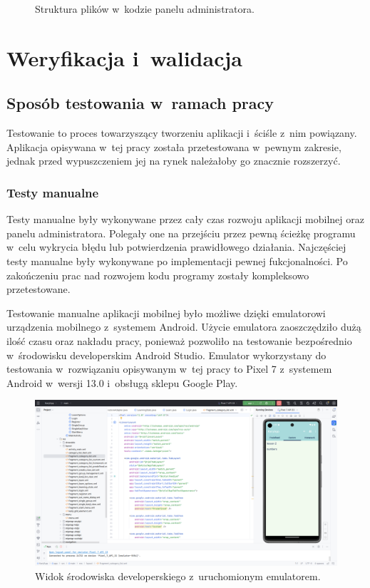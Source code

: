 \documentclass[a4paper,twoside,12pt]{book}
\begin{document}
\begin{figure}
\caption{Struktura plików w~kodzie panelu administratora.}
\label{fig:dirtree}
\end{figure}

\chapter{Weryfikacja i~walidacja}
\label{ch:06}

\section{Sposób testowania w~ramach pracy}

Testowanie to proces towarzyszący tworzeniu aplikacji i~ściśle z~nim powiązany. Aplikacja opisywana w~tej pracy została przetestowana w~pewnym zakresie, jednak przed wypuszczeniem jej na rynek należałoby go znacznie rozszerzyć.

\subsection{Testy manualne}

Testy manualne były wykonywane przez cały czas rozwoju aplikacji mobilnej oraz panelu administratora. Polegały one na przejściu przez pewną ścieżkę programu w~celu wykrycia błędu lub potwierdzenia prawidłowego działania. Najczęściej testy manualne były wykonywane po implementacji pewnej fukcjonalności. Po zakończeniu prac nad rozwojem kodu programy zostały kompleksowo przetestowane. 

Testowanie manualne aplikacji mobilnej było możliwe dzięki emulatorowi urządzenia mobilnego z~systemem Android. Użycie emulatora zaoszczędziło dużą ilość czasu oraz nakładu pracy, ponieważ pozwoliło na testowanie bezpośrednio w~środowisku developerskim Android Studio. Emulator wykorzystany do testowania w~rozwiązaniu opisywanym w~tej pracy to Pixel 7 z~systemem Android w~wersji 13.0 i~obsługą sklepu Google Play.

\begin{figure}[]
\centering
\includegraphics[width=\textwidth]{androidstudio}
\caption{Widok środowiska developerskiego z~uruchomionym emulatorem.}
\label{fig:androidstudio}
\end{figure}
\end{document}
